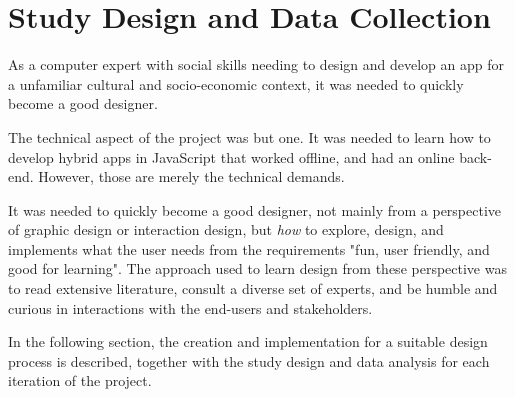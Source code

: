 \section{Study Design and Data Collection}

  As a computer expert with social skills needing to design and develop an app for a unfamiliar cultural and socio-economic context, it was needed to quickly become a good designer.

  The technical aspect of the project was but one. It was needed to learn how to develop hybrid apps in JavaScript that worked offline, and had an online back-end. However, those are merely the technical demands.

  It was needed to quickly become a good designer, not mainly from a perspective of graphic design or interaction design, but \textit{how} to explore, design, and implements what the user needs from the requirements "fun, user friendly, and good for learning". The approach used to learn design from these perspective was to read extensive literature, consult a diverse set of experts, and be humble and curious in interactions with the end-users and stakeholders.

  In the following section, the creation and implementation for a suitable design process is described, together with the study design and data analysis for each iteration of the project.












